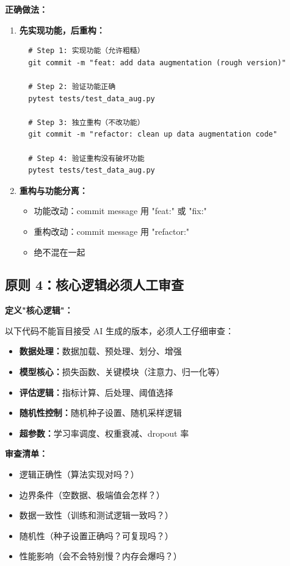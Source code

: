 \textbf{正确做法：}
\begin{enumerate}
  \item \textbf{先实现功能，后重构：}
  \begin{verbatim}
  # Step 1: 实现功能（允许粗糙）
  git commit -m "feat: add data augmentation (rough version)"

  # Step 2: 验证功能正确
  pytest tests/test_data_aug.py

  # Step 3: 独立重构（不改功能）
  git commit -m "refactor: clean up data augmentation code"

  # Step 4: 验证重构没有破坏功能
  pytest tests/test_data_aug.py
  \end{verbatim}

  \item \textbf{重构与功能分离：}
  \begin{itemize}
    \item 功能改动：commit message 用 "feat:" 或 "fix:"
    \item 重构改动：commit message 用 "refactor:"
    \item 绝不混在一起
  \end{itemize}
\end{enumerate}

\subsection{原则 4：核心逻辑必须人工审查}

\textbf{定义"核心逻辑"：}

以下代码不能盲目接受 AI 生成的版本，必须人工仔细审查：
\begin{itemize}
  \item \textbf{数据处理：}数据加载、预处理、划分、增强
  \item \textbf{模型核心：}损失函数、关键模块（注意力、归一化等）
  \item \textbf{评估逻辑：}指标计算、后处理、阈值选择
  \item \textbf{随机性控制：}随机种子设置、随机采样逻辑
  \item \textbf{超参数：}学习率调度、权重衰减、dropout 率
\end{itemize}

\textbf{审查清单：}
\begin{itemize}
  \item[$\square$] 逻辑正确性（算法实现对吗？）
  \item[$\square$] 边界条件（空数据、极端值会怎样？）
  \item[$\square$] 数据一致性（训练和测试逻辑一致吗？）
  \item[$\square$] 随机性（种子设置正确吗？可复现吗？）
  \item[$\square$] 性能影响（会不会特别慢？内存会爆吗？）
\end{itemize}

